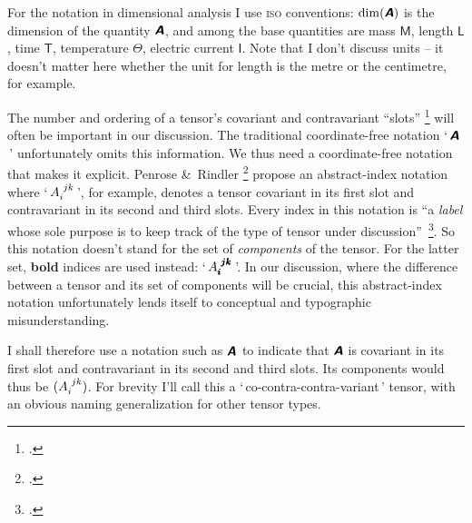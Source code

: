 \documentclass[a4paper,12pt,onecolumn,oneside,article,british]{memoir}
\makeatletter
\newcommand*{\defquote}[1]{`\,#1\,'}
\newcommand*{\mathte}[1]{\textbf{\textit{\textsf{#1}}}}
\newcommand*{\citep}{\footcites}
\newcommand*{\amp}{\&}
\newcommand*{\sect}{\S}%
\newcommand*{\q}{}%
\DeclareRobustCommand*{\q}{%
  \mathbin{\mathpalette\bigcdot@{}}%
}
\newcommand*{\bigcdot@scalefactor}{0.7}
\newcommand*{\bigcdot@widthfactor}{1.5}
\newcommand*{\bigcdot@}[2]{%
  \sbox0{$#1\vcenter{}$}%
  \sbox2{$#1\cdot\m@th$}%
  \hbox to \bigcdot@widthfactor\wd2{%
    \hfil
    \raise\ht0\hbox{%
      \scalebox{\bigcdot@scalefactor}{%
        \lower\ht0\hbox{$#1\bullet\m@th$}%
      }%
    }%
    \hfil
  }%
}
\newcommand*{\Le}{\textsf{L}}
\newcommand*{\Ti}{\textsf{T}}
\newcommand*{\Ma}{\textsf{M}}
\newcommand*{\Te}{\Theta}
\newcommand*{\Cu}{\textsf{I}}
\newcommand*{\yA}{\mathte{A}}
\renewcommand*{\i}{\indices}
\makeatother
\begin{document}
\bigskip

For the notation in dimensional analysis I use \textsc{iso} conventions:
$\dim(\yA)$ is the dimension of the quantity $\yA$, and among the base
quantities are mass $\Ma$, length $\Le$, time $\Ti$, temperature $\Te$,
electric current $\Cu$. Note that I don't discuss units -- it
doesn't matter here whether the unit for length is the metre or the
centimetre, for example.

The number and ordering of a tensor's covariant and contravariant
\enquote{slots} \citep[\sect~3.2]{misneretal1970_r1973} will often be
important in our discussion. The traditional coordinate-free notation
\defquote{$\yA$} unfortunately omits this information. We thus need a
coordinate-free notation that makes it explicit. Penrose \amp\ Rindler
\citep[\sect~2.2]{penroseetal1984_r2003} propose an abstract-index notation
where \defquote{$A\i{_{i}^{jk}}$}, for example, denotes a tensor covariant
in its first slot and contravariant in its second and third slots. Every
index in this notation is \enquote{a \emph{label} whose sole purpose is to
  keep track of the type of tensor under
  discussion}~\citep[p.~75]{penroseetal1984_r2003}. So this notation
doesn't stand for the set of \emph{components} of the tensor. For the
latter set, \textbf{bold} indices are used instead:
\defquote{$A\i{_{\pmb{i}}^{\pmb{j}\pmb{k}}}$}. In our discussion, where the
difference between a tensor and its set of components will be crucial, this
abstract-index notation unfortunately lends itself to conceptual and
typographic misunderstanding.

I shall therefore use a notation such as $\yA\i{_{\q}^{\q\q}}$ to indicate
that $\yA$ is covariant in its first slot and contravariant in its second
and third slots. Its components would thus be $(A\i{_{i}^{jk}})$. For
brevity I'll call this a \defquote{co-contra-contra-variant} tensor, with
an obvious naming generalization for other tensor
types. %
\end{document}
